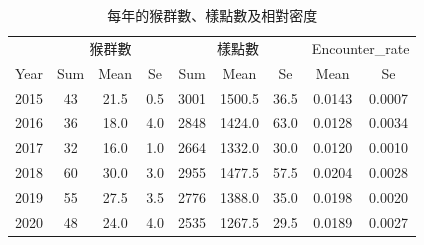 \documentclass[
]{article}
\begin{document}
\begin{table}

\caption{\label{tab:unnamed-chunk-11}每年的猴群數、樣點數及相對密度}
\centering
\begin{tabular}[t]{c|c|c|c|c|c|c|c|c}
\hline
\multicolumn{1}{c|}{ } & \multicolumn{3}{c|}{猴群數} & \multicolumn{3}{c|}{樣點數} & \multicolumn{2}{c}{Encounter\_rate} \\
\cline{2-4} \cline{5-7} \cline{8-9}
Year & Sum  & Mean  & Se  & Sum  & Mean  & Se  & Mean  & Se \\
\hline
2015 & 43 & 21.5 & 0.5 & 3001 & 1500.5 & 36.5 & 0.0143 & 0.0007\\
\hline
2016 & 36 & 18.0 & 4.0 & 2848 & 1424.0 & 63.0 & 0.0128 & 0.0034\\
\hline
2017 & 32 & 16.0 & 1.0 & 2664 & 1332.0 & 30.0 & 0.0120 & 0.0010\\
\hline
2018 & 60 & 30.0 & 3.0 & 2955 & 1477.5 & 57.5 & 0.0204 & 0.0028\\
\hline
2019 & 55 & 27.5 & 3.5 & 2776 & 1388.0 & 35.0 & 0.0198 & 0.0020\\
\hline
2020 & 48 & 24.0 & 4.0 & 2535 & 1267.5 & 29.5 & 0.0189 & 0.0027\\
\hline
\end{tabular}
\end{table}
\end{document}
